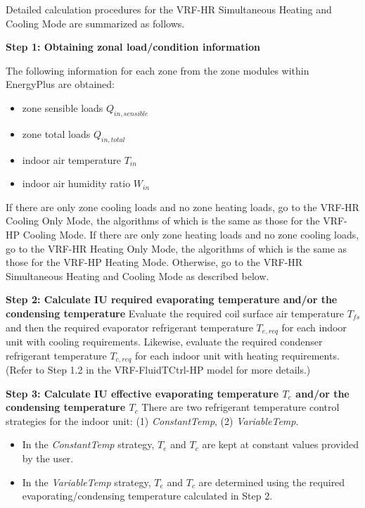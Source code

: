 Detailed calculation procedures for the VRF-HR Simultaneous Heating and Cooling Mode are summarized as follows.

\textbf{Step 1: Obtaining zonal load/condition information}

The following information for each zone from the zone modules within EnergyPlus are obtained: 

\begin{itemize}
  \item
    zone sensible loads $Q_{in, sensible}$
  \item
    zone total loads $Q_{in, total}$
  \item
    indoor air temperature $T_{in}$
  \item
    indoor air humidity ratio $W_{in}$
\end{itemize}

If there are only zone cooling loads and no zone heating loads, go to the VRF-HR Cooling Only Mode, the algorithms of which is the same as those for the VRF-HP Cooling Mode. If there are only zone heating loads and no zone cooling loads, go to the VRF-HR Heating Only Mode, the algorithms of which is the same as those for the VRF-HP Heating Mode. Otherwise, go to the VRF-HR Simultaneous Heating and Cooling Mode as described below.

\textbf{Step 2: Calculate IU required evaporating temperature and/or the condensing temperature}
Evaluate the required coil surface air temperature $T_{fs}$ and then the required evaporator refrigerant temperature $T_{e,req}$ for each indoor unit with cooling requirements. Likewise, evaluate the required condenser refrigerant temperature ${T_{c,req}}$ for each indoor unit with heating requirements.
(Refer to Step 1.2 in the VRF-FluidTCtrl-HP model for more details.)

\textbf{Step 3: Calculate IU effective evaporating temperature $T_e$ and/or the condensing temperature $T_c$}
There are two refrigerant temperature control strategies for the indoor unit: (1) \emph{ConstantTemp}, (2) \emph{VariableTemp}.

\begin{itemize}
  \item
    In the \emph{ConstantTemp} strategy, $T_e$ and $T_c$ are kept at constant values provided by the user.
  \item
    In the \emph{VariableTemp} strategy, $T_e$ and $T_c$ are determined using the required evaporating/condensing temperature calculated in Step 2.
\end{itemize}

